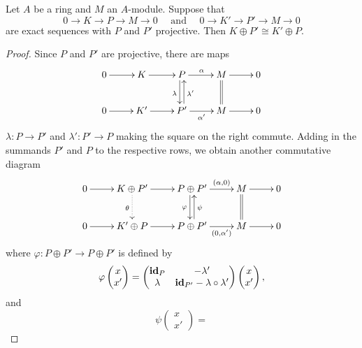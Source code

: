 \begin{lemma}[Schanuel]
    Let $A$ be a ring and $M$ an $A$-module. Suppose that 
    \begin{equation*}
        0\to K\to P\to M\to 0\quad\text{ and }\quad 0\to K'\to P'\to M\to 0
    \end{equation*}
    are exact sequences with $P$ and $P'$ projective. Then $K\oplus P'\cong K'\oplus P$.
\end{lemma}
\begin{proof}
    Since $P$ and $P'$ are projective, there are maps 
    \begin{equation*}
        \xymatrix {
            0\ar[r] & K\ar[r] & P\ar[r]^\alpha\ar@<-.5ex>[d]_\lambda & M\ar[r]\ar@{=}[d] & 0\\
            0\ar[r] & K'\ar[r] & P'\ar[r]_{\alpha'}\ar@<-.5ex>[u]_{\lambda'} & M\ar[r] & 0
        }
    \end{equation*}
    $\lambda\colon P\to P'$ and $\lambda'\colon P'\to P$ making the square on the right commute. Adding in the summands $P'$ and $P$ to the respective rows, we obtain another commutative diagram 
    \begin{equation*}
        \xymatrix {
            0\ar[r] & K\oplus P'\ar[r]\ar@{.>}[d]_\theta & P\oplus P'\ar[r]^-{(\alpha, 0)}\ar@<-.5ex>[d]_\varphi & M\ar[r]\ar@{=}[d] & 0\\
            0\ar[r] & K'\oplus P\ar[r] & P\oplus P'\ar[r]_-{(0, \alpha')}\ar@<-.5ex>[u]_{\psi} & M\ar[r] & 0
        }
    \end{equation*}
    where $\varphi\colon P\oplus P'\to P\oplus P'$ is defined by 
    \begin{equation*}
        \varphi\begin{pmatrix}x\\ x'\end{pmatrix} = 
        \begin{pmatrix}
            \mathbf{id}_P & -\lambda'\\
            \lambda & \mathbf{id}_{P'} - \lambda\circ\lambda'
        \end{pmatrix}
        \begin{pmatrix}
            x\\ x'
        \end{pmatrix},
    \end{equation*}
    and 
    \begin{equation*}
        \psi\begin{pmatrix}
            x\\x'
        \end{pmatrix} = 

\end{equation*}
\end{proof}
